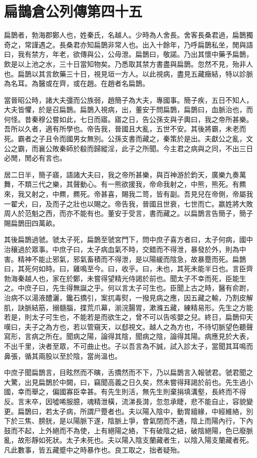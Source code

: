 \chapter{扁鵲倉公列傳第四十五}

扁鵲者，勃海郡鄭人也，姓秦氏，名越人。少時為人舍長。舍客長桑君過，扁鵲獨奇之，常謹遇之。長桑君亦知扁鵲非常人也。出入十餘年，乃呼扁鵲私坐，閒與語曰，我有禁方，年老，欲傳與公，公毋泄。扁鵲曰，敬諾。乃出其懷中藥予扁鵲，飲是以上池之水，三十日當知物矣。乃悉取其禁方書盡與扁鵲。忽然不見，殆非人也。扁鵲以其言飲藥三十日，視見垣一方人。以此視病，盡見五藏癥結，特以診脈為名耳。為醫或在齊，或在趙。在趙者名扁鵲。

當晉昭公時，諸大夫彊而公族弱，趙簡子為大夫，專國事。簡子疾，五日不知人，大夫皆懼，於是召扁鵲。扁鵲入視病，出，董安于問扁鵲，扁鵲曰，血脈治也，而何怪。昔秦穆公嘗如此，七日而寤。寤之日，告公孫支與子輿曰，我之帝所甚樂。吾所以久者，適有所學也。帝告我，晉國且大亂，五世不安。其後將霸，未老而死。霸者之子且令而國男女無別。公孫支書而藏之，秦策於是出。夫獻公之亂，文公之霸，而襄公敗秦師於殽而歸縱淫，此子之所聞。今主君之病與之同，不出三日必閒，閒必有言也。

居二日半，簡子寤，語諸大夫曰，我之帝所甚樂，與百神游於鈞天，廣樂九奏萬舞，不類三代之樂，其聲動心。有一熊欲援我，帝命我射之，中熊，熊死。有羆來，我又射之，中羆，羆死。帝甚喜，賜我二笥，皆有副。吾見兒在帝側，帝屬我一翟犬，曰，及而子之壯也以賜之。帝告我，晉國且世衰，七世而亡。嬴姓將大敗周人於范魁之西，而亦不能有也。董安于受言，書而藏之。以扁鵲言告簡子，簡子賜扁鵲田四萬畝。

其後扁鵲過虢。虢太子死，扁鵲至虢宮門下，問中庶子喜方者曰，太子何病，國中治穰過於眾事。中庶子曰，太子病血氣不時，交錯而不得泄，暴發於外，則為中害。精神不能止邪氣，邪氣畜積而不得泄，是以陽緩而陰急，故暴蹷而死。扁鵲曰，其死何如時。曰，雞鳴至今。曰，收乎。曰，未也，其死未能半日也。言臣齊勃海秦越人也，家在於鄭，未嘗得望精光侍謁於前也。聞太子不幸而死，臣能生之。中庶子曰，先生得無誕之乎。何以言太子可生也。臣聞上古之時，醫有俞跗，治病不以湯液醴灑，鑱石撟引，案扤毒熨，一撥見病之應，因五藏之輸，乃割皮解肌，訣脈結筋，搦髓腦，揲荒爪幕，湔浣腸胃，漱滌五藏，練精易形。先生之方能若是，則太子可生也，不能若是而欲生之，曾不可以告咳嬰之兒。終日，扁鵲仰天嘆曰，夫子之為方也，若以管窺天，以郄視文。越人之為方也，不待切脈望色聽聲寫形，言病之所在。聞病之陽，論得其陰，聞病之陰，論得其陽。病應見於大表，不出千里，決者至眾，不可曲止也。子以吾言為不誠，試入診太子，當聞其耳鳴而鼻張，循其兩股以至於陰，當尚溫也。

中庶子聞扁鵲言，目眩然而不瞚，舌撟然而不下，乃以扁鵲言入報虢君。虢君聞之大驚，出見扁鵲於中闕，曰，竊聞高義之日久矣，然未嘗得拜謁於前也。先生過小國，幸而舉之，偏國寡臣幸甚。有先生則活，無先生則棄捐填溝壑，長終而不得反。言末卒，因噓唏服臆，魂精泄橫，流涕長潸，忽忽承睫，悲不能自止，容貌變更。扁鵲曰，若太子病，所謂尸蹷者也。夫以陽入陰中，動胃繵緣，中經維絡，別下於三焦、膀胱，是以陽脈下遂，陰脈上爭，會氣閉而不通，陰上而陽內行，下內鼓而不起，上外絕而不為使，上有絕陽之絡，下有破陰之紐，破陰絕陽，色已廢脈亂，故形靜如死狀。太子未死也。夫以陽入陰支蘭藏者生，以陰入陽支蘭藏者死。凡此數事，皆五藏蹙中之時暴作也。良工取之，拙者疑殆。

